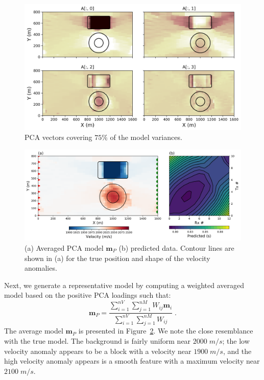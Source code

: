 \documentclass[extra,referee]{gji}
\begin{document}
\begin{figure}
{\centering
\includegraphics[width=\columnwidth]{Figures/Tomo2D_StackPCA.png}
\caption{PCA vectors covering $75\%$ of the model variances.}\label{PCA_vectors}}
\end{figure}
\begin{figure}
{\centering
\includegraphics[width=\columnwidth]{Figures/Results_PCA_model.png}
\caption{(a) Averaged PCA model $\mathbf{m}_P$ (b) predicted data. Contour lines are shown in (a) for the true position and shape of the velocity anomalies.}\label{PCA_model}}
\end{figure}
Next, we generate a representative model by computing a weighted averaged model based on the positive PCA loadings such that:
\begin{equation}\label{weightedaverage}
\mathbf{m}_P = \frac{\sum_{i=1}^{nV} \sum_{j=1}^{nM} W_{ij} \mathbf{m}_i}{ \sum_{i=1}^{nV} \sum_{j=1}^{nM} W_{ij}} \;.
\end{equation}
The average model $\mathbf{m}_P$ is presented in Figure~\ref{PCA_model}. We note the close resemblance with the true model. The background is fairly uniform near $2000\;m/s$; the low velocity anomaly appears to be a block with a velocity near $1900\;m/s$, and the high velocity anomaly appears is a smooth feature with a maximum velocity near $2100\;m/s$.
\end{document}
